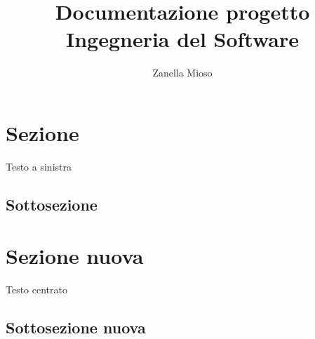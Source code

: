\documentclass{article}
\author{Zanella Mioso}
\title{Documentazione progetto Ingegneria del Software}
\begin{document}
\maketitle

\newpage

\tableofcontents

\newpage

\section{Sezione}

\begin{flushleft}
Testo a sinistra
\end{flushleft}

\subsection{Sottosezione}

\section{Sezione nuova}

\begin{center}
Testo centrato
\end{center}

\subsection{Sottosezione nuova}
\end{document}
